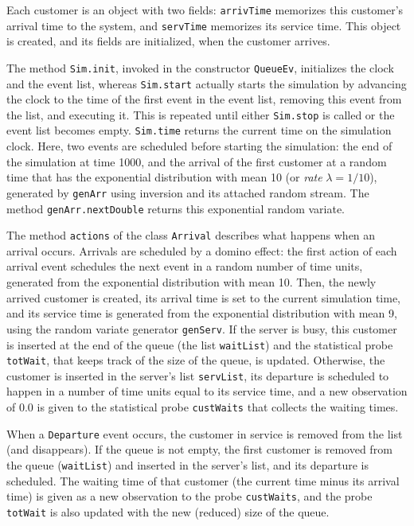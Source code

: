 Each customer is an object with two fields: \texttt{arrivTime}
memorizes this customer's arrival time to the system, and
\texttt{servTime} memorizes its service time.
This object is created, and its fields are initialized, 
when the customer arrives.

The method \texttt{Sim.init}, invoked in the constructor \texttt{QueueEv},
initializes the clock and the event list, 
whereas \texttt{Sim.start} actually starts the simulation 
by advancing the clock to the time of
the first event in the event list, removing this event
from the list, and executing it.  This is repeated until either
\texttt{Sim.stop} is called or the event list becomes empty.
\texttt{Sim.time} returns the current time on the simulation clock.
Here, two events are scheduled before starting the simulation:
the end of the simulation at time 1000, and the
arrival of the first customer at a random time that has the exponential
distribution with mean 10 (or \emph{rate} $\lambda=1/10$), 
generated by \texttt{genArr} using inversion and its attached random stream.
The method \texttt{genArr.nextDouble} returns this exponential random variate.

The method \texttt{actions} of the class \texttt{Arrival} describes what happens
when an arrival occurs.  
Arrivals are scheduled by a domino effect: 
the first action of each arrival event schedules the next event in
a random number of time units, generated from the exponential distribution
with mean 10.
Then, the newly arrived customer is created,
its arrival time is set to the current simulation time,
and its service time is generated from the exponential
distribution with mean 9, using the random variate generator \texttt{genServ}.
If the server is busy, this customer is inserted at the end of the
queue (the list \texttt{waitList}) and the statistical probe 
\texttt{totWait}, that keeps track of the size of the queue, is updated.
Otherwise, the customer is inserted in the server's list \texttt{servList},
its departure is scheduled to happen in a number of time units 
equal to its service time, and a new observation of 0.0 is given to the
statistical probe \texttt{custWaits} that collects the waiting times.

When a \texttt{Departure} event occurs, the customer in service is 
removed from the list (and disappears).
If the queue is not empty, the first customer is removed from
the queue (\texttt{waitList}) and inserted in the server's list,
and its departure is scheduled.
The waiting time of that customer (the current time minus its
arrival time) is given as a new observation to the probe
\texttt{custWaits}, and the probe \texttt{totWait} is also updated
with the new (reduced) size of the queue.

